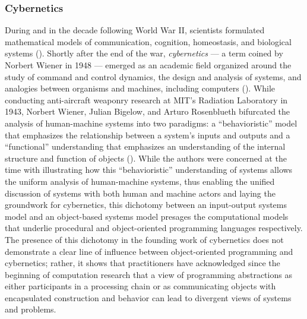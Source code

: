 \subsubsection{Cybernetics}
During and in the decade following World War II, scientists formulated mathematical models of communication, cognition, homeostasis, and biological systems (\cite{Aspray:1985uq}). Shortly after the end of the war, \emph{cybernetics} --- a term coined by Norbert Wiener in 1948 --- emerged as an academic field organized around the study of command and control dynamics, the design and analysis of systems, and analogies between organisms and machines, including computers (\cite{Dunbar-Hester2009}). While conducting anti-aircraft weaponry research at MIT's Radiation Laboratory in 1943, Norbert Wiener, Julian Bigelow, and Arturo Rosenblueth bifurcated the analysis of human-machine systems into two paradigms: a ``behavioristic'' model that emphasizes the relationship between a system's inputs and outputs and a ``functional'' understanding that emphasizes an understanding of the internal structure and function of objects (\cite{Priestley:2011ve}). While the authors were concerned at the time with illustrating how this ``behavioristic'' understanding of systems allows the uniform analysis of human-machine systems, thus enabling the unified discussion of systems with both human and machine actors and laying the groundwork for cybernetics, this dichotomy between an input-output systems model and an object-based systems model presages the computational models that underlie procedural and object-oriented programming languages respectively. The presence of this dichotomy in the founding work of cybernetics does not demonstrate a clear line of influence between object-oriented programming and cybernetics; rather, it shows that practitioners have acknowledged since the beginning of computation research that a view of programming abstractions as either participants in a processing chain or as communicating objects with encapsulated construction and behavior can lead to divergent views of systems and problems.

